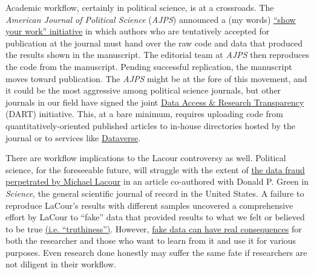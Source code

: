 \documentclass[11pt,]{article}
\begin{document}
Academic workflow, certainly in political science, is at a crossroads.
The \emph{American Journal of Political Science} (\emph{AJPS}) announced
a (my words)
\href{http://ajps.org/2015/03/26/the-ajps-replication-policy-innovations-and-revisions/}{``show
your work'' initiative} in which authors who are tentatively accepted
for publication at the journal must hand over the raw code and data that
produced the results shown in the manuscript. The editorial team at
\emph{AJPS} then reproduces the code from the manuscript. Pending
successful replication, the manuscript moves toward publication. The
\emph{AJPS} might be at the fore of this movement, and it could be the
most aggressive among political science journals, but other journals in
our field have signed the joint
\href{http://www.dartstatement.org/}{Data Access \& Research
Transparency} (DART) initiative. This, at a bare minimum, requires
uploading code from quantitatively-oriented published articles to
in-house directories hosted by the journal or to services like
\href{http://dataverse.org/}{Dataverse}.

There are workflow implications to the Lacour controversy as well.
Political science, for the foreseeable future, will struggle with the
extent of
\href{http://stanford.edu/~dbroock/broockman_kalla_aronow_lg_irregularities.pdf}{the
data fraud perpetrated by Michael Lacour} in an article co-authored with
Donald P. Green in \emph{Science}, the general scientific journal of
record in the United States. A failure to reproduce LaCour's results
with different samples uncovered a comprehensive effort by LaCour to
``fake'' data that provided results to what we felt or believed to be
true \href{http://chronicle.com/article/LAffaire-LaCour/230905/}{(i.e.
``truthiness'')}. However,
\href{http://kieranhealy.org/blog/archives/2015/05/20/fake-science-real-consequences/}{fake
data can have real consequences} for both the researcher and those who
want to learn from it and use it for various purposes. Even research
done honestly may suffer the same fate if researchers are not diligent
in their workflow.
\end{document}
